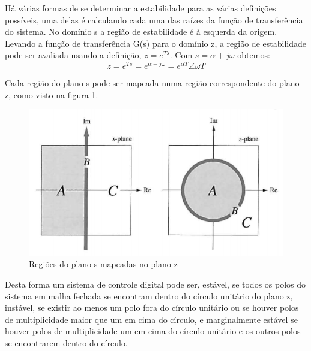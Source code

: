 Há várias formas de se determinar a estabilidade para as várias definições possíveis, uma delas é calculando cada uma das raízes da função de transferência do sistema. No domínio s a região de estabilidade é à esquerda da origem. Levando a função de transferência G(s) para o domínio z, a região de estabilidade pode ser avaliada usando a definição, $z=e^{Ts}$. Com $s=\alpha +j\omega$ obtemos:
\begin{equation}
z=e^{Ts}=e^{\alpha+j\omega}=e^{\alpha T}\angle \omega T
\end{equation}

Cada região do plano s pode ser mapeada numa região correspondente do plano z, como visto na figura \ref{fig:planoestabilidadedigital}.

\begin{figure}
	\centering
	\includegraphics[width=0.7\linewidth]{plano_estabilidade_digital}
	\caption{Regiões do plano s mapeadas no plano z}
	\label{fig:planoestabilidadedigital}
\end{figure}

Desta forma um sistema de controle digital pode ser, estável, se todos os polos do sistema em malha fechada se encontram dentro do círculo unitário do plano z, instável, se existir ao menos um polo fora do círculo unitário ou se houver polos de multiplicidade maior que um em cima do círculo, e marginalmente estável se houver polos de multiplicidade um em cima do círculo unitário e os outros polos se encontrarem dentro do círculo.


